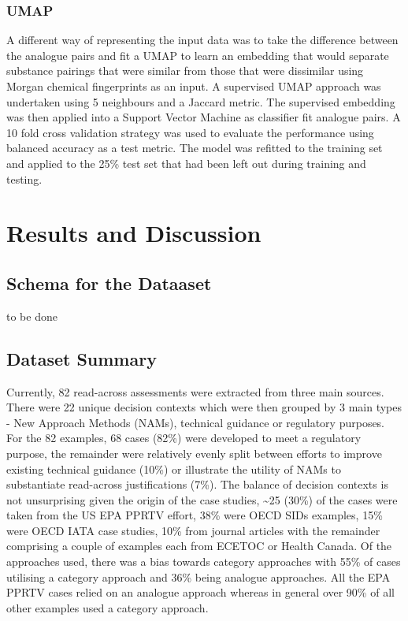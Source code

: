 \documentclass[
  super,
  preprint,
  3p]{elsarticle}
\begin{document}
\subsubsection{UMAP}\label{umap}

A different way of representing the input data was to take the
difference between the analogue pairs and fit a UMAP to learn an
embedding that would separate substance pairings that were similar from
those that were dissimilar using Morgan chemical fingerprints as an
input. A supervised UMAP approach was undertaken using 5 neighbours and
a Jaccard metric. The supervised embedding was then applied into a
Support Vector Machine as classifier fit analogue pairs. A 10 fold cross
validation strategy was used to evaluate the performance using balanced
accuracy as a test metric. The model was refitted to the training set
and applied to the 25\% test set that had been left out during training
and testing.

\section{Results and Discussion}\label{results-and-discussion}

\subsection{Schema for the Dataaset}\label{schema-for-the-dataaset}

to be done

\subsection{Dataset Summary}\label{dataset-summary}

Currently, 82 read-across assessments were extracted from three main
sources. There were 22 unique decision contexts which were then grouped
by 3 main types - New Approach Methods (NAMs), technical guidance or
regulatory purposes. For the 82 examples, 68 cases (82\%) were developed
to meet a regulatory purpose, the remainder were relatively evenly split
between efforts to improve existing technical guidance (10\%) or
illustrate the utility of NAMs to substantiate read-across
justifications (7\%). The balance of decision contexts is not
unsurprising given the origin of the case studies, \textasciitilde25
(30\%) of the cases were taken from the US EPA PPRTV effort, 38\% were
OECD SIDs examples, 15\% were OECD IATA case studies, 10\% from journal
articles with the remainder comprising a couple of examples each from
ECETOC or Health Canada. Of the approaches used, there was a bias
towards category approaches with 55\% of cases utilising a category
approach and 36\% being analogue approaches. All the EPA PPRTV cases
relied on an analogue approach whereas in general over 90\% of all other
examples used a category approach.
\end{document}
